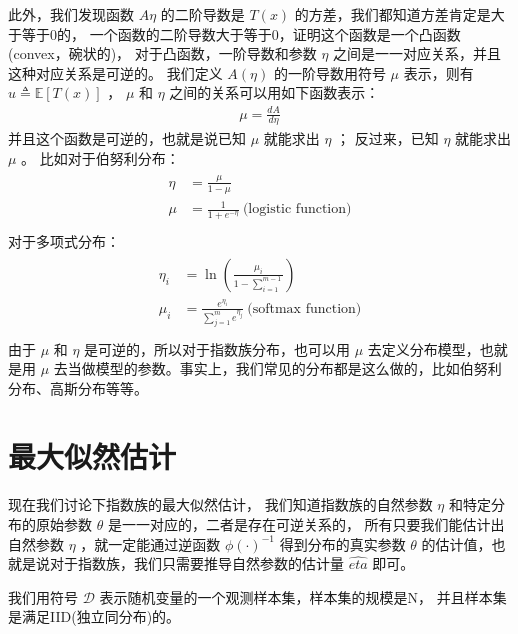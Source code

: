 \documentclass[letterpaper,10pt,english]{sphinxmanual}
\begin{document}
此外，我们发现函数 \(A{\eta}\) 的二阶导数是 \(T(x)\) 的方差，我们都知道方差肯定是大于等于0的，
一个函数的二阶导数大于等于0，证明这个函数是一个凸函数(convex，碗状的)，
对于凸函数，一阶导数和参数 \(\eta\) 之间是一一对应关系，并且这种对应关系是可逆的。
我们定义 \(A(\eta)\) 的一阶导数用符号 \(\mu\) 表示，则有 \(u\triangleq \mathbb{E}[T(x)]\)
， \(\mu\) 和 \(\eta\) 之间的关系可以用如下函数表示：
\begin{equation}\label{equation:指数族/content:指数族/content:23}
\begin{split}\mu = \frac{d A}{d \eta}\end{split}
\end{equation}
并且这个函数是可逆的，也就是说已知 \(\mu\) 就能求出 \(\eta\) ；
反过来，已知 \(\eta\) 就能求出 \(\mu\) 。
比如对于伯努利分布：
\begin{align}\label{equation:指数族/content:指数族/content:24}\!\begin{aligned}
\eta &= \frac{\mu}{1-\mu}\\
\mu &= \frac{1}{1+e^{-\eta}} \ \text{(logistic function)}\\
\end{aligned}\end{align}
对于多项式分布：
\begin{align}\label{equation:指数族/content:指数族/content:25}\!\begin{aligned}
\eta_i &= \ln \left ( \frac{\mu_i}{1-\sum_{i=1}^{m-1}} \right )\\
\mu_i &= \frac{e^{\eta_i}}{\sum_{j=1}^{m} e^{\eta_j}} \ \text{(softmax function)}\\
\end{aligned}\end{align}
由于 \(\mu\) 和 \(\eta\) 是可逆的，所以对于指数族分布，也可以用 \(\mu\) 去定义分布模型，也就是用
\(\mu\) 去当做模型的参数。事实上，我们常见的分布都是这么做的，比如伯努利分布、高斯分布等等。


\section{最大似然估计}
\label{\detokenize{_u6307_u6570_u65cf/content:id9}}
现在我们讨论下指数族的最大似然估计，
我们知道指数族的自然参数 \(\eta\) 和特定分布的原始参数 \(\theta\) 是一一对应的，二者是存在可逆关系的，
所有只要我们能估计出自然参数 \(\eta\) ，就一定能通过逆函数 \(\phi(\cdot)^{-1}\) 得到分布的真实参数
\(\theta\) 的估计值，也就是说对于指数族，我们只需要推导自然参数的估计量 \(\hat{eta}\)  即可。

我们用符号 \(\mathcal{D}\) 表示随机变量的一个观测样本集，样本集的规模是N，
并且样本集是满足IID(独立同分布)的。
\end{document}
